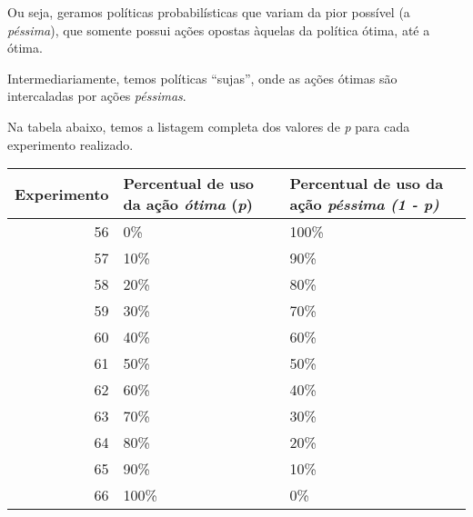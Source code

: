 \documentclass[11pt]{article}
\begin{document}
\begin{description}
\begin{description}
Ou seja, geramos políticas probabilísticas que variam da pior possível (a \emph{péssima}), que somente possui ações opostas àquelas da política ótima, até a ótima.

Intermediariamente, temos políticas ``sujas'', onde as ações ótimas são intercaladas por ações \emph{péssimas}.

Na tabela abaixo, temos a listagem completa dos valores de \emph{p} para cada experimento realizado.


\begin{center}
\begin{tabular}{rll}
 Experimento  &  Percentual de uso da ação \emph{ótima} (\emph{p})  &  Percentual de uso da ação \emph{péssima} \emph{(1 - p)}  \\
\hline
          56  &  0\%                                                &  100\%                                                    \\
          57  &  10\%                                               &  90\%                                                     \\
          58  &  20\%                                               &  80\%                                                     \\
          59  &  30\%                                               &  70\%                                                     \\
          60  &  40\%                                               &  60\%                                                     \\
          61  &  50\%                                               &  50\%                                                     \\
          62  &  60\%                                               &  40\%                                                     \\
          63  &  70\%                                               &  30\%                                                     \\
          64  &  80\%                                               &  20\%                                                     \\
          65  &  90\%                                               &  10\%                                                     \\
          66  &  100\%                                              &  0\%                                                      \\
\end{tabular}
\end{center}




\end{description}
\end{description}
\end{document}
